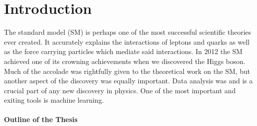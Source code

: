 \chapter*{Introduction}
The standard model (SM) is perhaps one of the most successful scientific theories ever created. It accurately explains the interactions of leptons and quarks as well as the force carrying particles which mediate said interactions. In 2012 the SM achieved one of its crowning achievements when we discovered the Higgs boson. Much of the accolade was rightfully given to the theoretical work on the SM, but another aspect of the discovery was equally important. Data analysis was and is a crucial part of any new discovery in physics. One of the most important and exiting tools is machine learning.




\subsubsection*{Outline of the Thesis}




